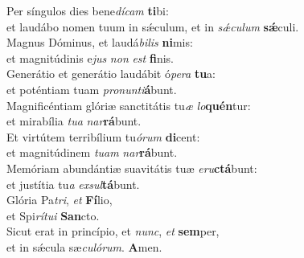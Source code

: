 \evenverse Per síngulos dies bene\textit{dí}\textit{cam} \textbf{ti}bi:~\*\\
\evenverse et laudábo nomen tuum in sǽculum, et in \textit{sǽ}\textit{cu}\textit{lum} \textbf{sǽ}culi.\\
\oddverse Magnus Dóminus, et laudá\textit{bi}\textit{lis} \textbf{ni}mis:~\*\\
\oddverse et magnitúdinis e\textit{jus} \textit{non} \textit{est} \textbf{fi}nis.\\
\evenverse Generátio et generátio laudábit ó\textit{pe}\textit{ra} \textbf{tu}a:~\*\\
\evenverse et poténtiam tuam \textit{pro}\textit{nun}\textit{ti}\textbf{á}bunt.\\
\oddverse Magnificéntiam glóriæ sanctitátis tu\textit{æ} \textit{lo}\textbf{quén}tur:~\*\\
\oddverse et mirabília \textit{tu}\textit{a} \textit{nar}\textbf{rá}bunt.\\
\evenverse Et virtútem terribílium tu\textit{ó}\textit{rum} \textbf{di}cent:~\*\\
\evenverse et magnitúdinem \textit{tu}\textit{am} \textit{nar}\textbf{rá}bunt.\\
\oddverse Memóriam abundántiæ suavitátis tuæ \textit{e}\textit{ru}\textbf{ctá}bunt:~\*\\
\oddverse et justítia tu\textit{a} \textit{ex}\textit{sul}\textbf{tá}bunt.\\
\evenverse Glória Pa\textit{tri}, \textit{et} \textbf{Fí}lio,~\*\\
\evenverse et Spi\textit{rí}\textit{tu}\textit{i} \textbf{San}cto.\\
\oddverse Sicut erat in princípio, et \textit{nunc}, \textit{et} \textbf{sem}per,~\*\\
\oddverse et in sǽcula sæ\textit{cu}\textit{ló}\textit{rum}. \textbf{A}men.\\

